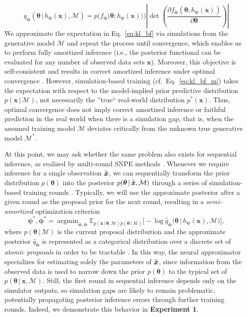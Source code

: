 \documentclass[twoside,11pt]{article}
\newcommand{\observed}[1]{\protect\accentset{\text{o}}{#1}}%
\newcommand{\numberGaussianMeans}{1}
\newcommand{\x}{\boldsymbol{x}}
\newcommand{\thetab}{\boldsymbol{\theta}}
\newcommand{\phib}{\boldsymbol{\phi}}
\newcommand{\psib}{\boldsymbol{\psi}}
\newcommand{\0}{\boldsymbol{0}}
\newcommand{\given}{\,|\,}
\newcommand{\postm}{p(\thetab \given \x, \mathcal{M})}
\newcommand{\prior}{p(\thetab)}
\newcommand{\M}{\mathcal{M}}
\DeclareMathOperator*{\argmin}{argmin}
\renewcommand{\cite}[1]{\citep{#1}}
\begin{document}
\begin{equation}
    q_{\phib}(\thetab \given h_{\psib}(\x), \mathcal{M}) = p\Big(f_{\phib}\big(\thetab; h_{\psib}(\x)\big)\Big)\left|\det \left(\frac{\partial f_{\phib}(\thetab;h_{\psib}(\x))}{\partial \thetab}\right)\right| \label{eq:cinn}
\end{equation}
We approximate the expectation in Eq.~\ref{eq:kl_bf} via simulations from the generative model $\M$ and repeat the process until convergence, which enables us to perform fully amortized inference (i.e., the posterior functional can be evaluated for any number of observed data sets $\x$).
Moreover, this objective is self-consistent and results in correct amortized inference under optimal convergence \cite{apt, bayesflow}.
However, simulation-based training (cf.\ Eq.~\ref{eq:kl_bf_m}) takes the expectation with respect to the model-implied prior predictive distribution~$p(\x\given\M)$, not necessarily the ''true`` real-world distribution $p^*(\x)$.
Thus, optimal convergence does not imply correct amortized inference or faithful prediction in the real world when there is a simulation gap, that is, when the assumed training model $\M$ deviates critically from the unknown true generative model $\M^*$.

At this point, we may ask whether the same problem also exists for sequential inference, as realized by multi-round SNPE methods \cite{contrastive, apt}. 
Whenever we require inference for a single observation $\observed{\x}$, we can sequentially transform the prior distribution $\prior$ into the posterior $p(\thetab \given \observed{\x}, \mathcal{M})$ through a series of simulation-based training rounds \citep{contrastive, apt}.
Typically, we will use the approximate posterior after a given round as the proposal prior for the next round, resulting in a \textit{semi-amortized} optimization criterion
\begin{equation}
  \psib^*, \phib^* =
  \argmin_{\psib, \phib}  
    \mathbb{E}_{p(\x \given \thetab, \mathcal{M}) \widehat{p}(\thetab \given \mathcal{M})}\Big[-\log \widehat{q}_{\phib}\big(\thetab \given h_{\psib}(\x), \mathcal{M}\big)\Big], \label{eq:kl_apt}
\end{equation}
where $\widehat{p}(\thetab \given \mathcal{M})$ is the current proposal distribution and the approximate posterior $\widehat{q}_{\phib}$ is represented as a categorical distribution over a discrete set of \textit{atomic proposals} in order to be tractable \cite{apt}.
In this way, the neural approximator specializes for estimating solely the parameters of $\observed{\x}$, since information from the observed data is used to narrow down the prior $\prior$ to the typical set of $\postm$.
Still, the first round in sequential inference depends only on the simulator outputs, so simulation gaps are likely to remain problematic, potentially propagating posterior inference errors through further training rounds. 
Indeed, we demonstrate this behavior in \textbf{Experiment \numberGaussianMeans}.
\end{document}
